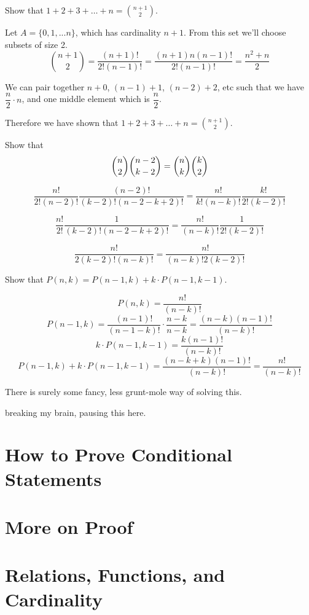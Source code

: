 \documentclass[openany, 11pt]{book}
\begin{document}
\begin{exercise}{}{}
	Show that $1 + 2 + 3 + \dots + n = \binom{n+1}{2}$.
	\begin{alist}
		\item Let $A=\{0, 1, ... n\}$, which has cardinality $n+1$.  From this set we'll
		choose subsets of size 2.
		$$
			\binom{n+1}{2} =
			\dfrac{(n+1)!}{2!(n-1)!} =
			\dfrac{(n+1)n(n-1)!}{2!(n-1)!} =
			\dfrac{n^2+n}{2}
		$$
		\item We can pair together $n+0$, $(n-1) + 1$, $(n-2) + 2$, etc such that we
		have $\dfrac{n}{2}\cdot n$, and one middle element which is $\dfrac{n}{2}$.
		\item Therefore we have shown that $1 + 2 + 3 + \dots + n = \binom{n+1}{2}$.
	\end{alist}
\end{exercise}

\begin{exercise}{}{}
	Show that
	$$ \dbinom{n}{2} \dbinom{n-2}{k-2}= \dbinom{n}{k} \dbinom{k}{2} $$
	\begin{alist}
		\item
		$$ \dfrac{n!}{2!(n-2)!} \dfrac{(n-2)!}{(k-2)!(n-2-k+2)!}=
			\dfrac{n!}{k!(n-k)!} \dfrac{k!}{2!(k-2)!} $$
		\item
		$$ \dfrac{n!}{2!} \dfrac{1}{(k-2)!(n-2-k+2)!}= \dfrac{n!}{(n-k)!} \dfrac{1}{2!(k-2)!} $$
		\item
		$$ \dfrac{n!}{2(k-2)!(n-k)!}= \dfrac{n!}{(n-k)!2(k-2)!} $$
	\end{alist}
\end{exercise}

\begin{exercise}{}{}
	Show that $P(n,k) = P(n-1,k)+ k \cdot P(n-1,k -1)$.
	\begin{alist}
		\item
		$$ P(n,k) = \dfrac{n!}{(n-k)!}$$
		$$ P(n-1,k) =  \dfrac{(n-1)!}{(n-1-k)!}\cdot\dfrac{n-k}{n-k} =\dfrac{(n-k)(n-1)!}{(n-k)!}
		$$
		$$ k\cdot P(n-1,k -1) = \dfrac{k(n-1)!}{(n-k)!}$$
		$$ P(n-1,k)+ k \cdot P(n-1,k -1) = \dfrac{(n-k+k)(n-1)!}{(n-k)!} =
			\dfrac{n!}{(n-k)!}
		$$
		\item There is surely some fancy, less grunt-mole way of solving this.
	\end{alist}
\end{exercise}

breaking my brain, pausing this here.

\part{How to Prove Conditional Statements}
\part{More on Proof}
\part{Relations, Functions, and Cardinality}
\end{document}
